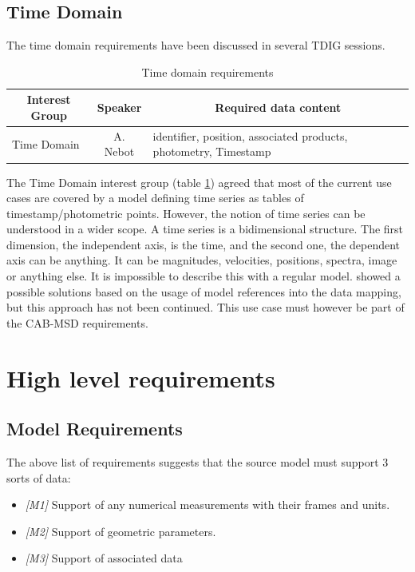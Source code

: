 \documentclass[11pt,a4paper]{ivoa}
\begin{document}
\subsection{Time Domain}
The time domain requirements have been discussed in several TDIG sessions. 
\begin{table}[H]
\begin{tabular}{|p{7em}|c|p{17em}|}
  \hline
        \multicolumn{1}{|c}{\bfseries Interest Group} & \multicolumn{1}{|c}{\bfseries Speaker} & \multicolumn{1}{|c|}{\bfseries Required data content}\\
  \hline
  Time Domain & A. Nebot & 
identifier, position, associated products, 
photometry, Timestamp
 \\
\hline
\end{tabular}
\caption{Time domain requirements}
\label{table:ttime}
\end{table}

The Time Domain interest  group (table \ref{table:ttime}) agreed that most of the current use cases are covered by a model defining time series as tables of timestamp/photometric points. However, the notion of time series can be understood in a wider scope. A time series is a bidimensional structure. The first dimension, the independent axis, is the time, and the second one, the dependent axis can be anything. It can be magnitudes, velocities, positions, spectra, image or anything else.  It is impossible to describe this with a regular model. \cite{talk:lmanything}  showed  a possible solutions based on the usage of model references into the data mapping, but this approach has not been continued. This use case must however be part of the CAB-MSD requirements. 

\section{High level requirements}

\subsection{Model Requirements}
The above list of requirements suggests that the source model must support 3 sorts of data:

\begin{itemize}
    \item \textit{[M1]} Support of any numerical measurements with their frames and units. 
    \item \textit{[M2]} Support of geometric parameters.
    \item \textit{[M3]} Support of associated data
\end{itemize}
\end{document}
